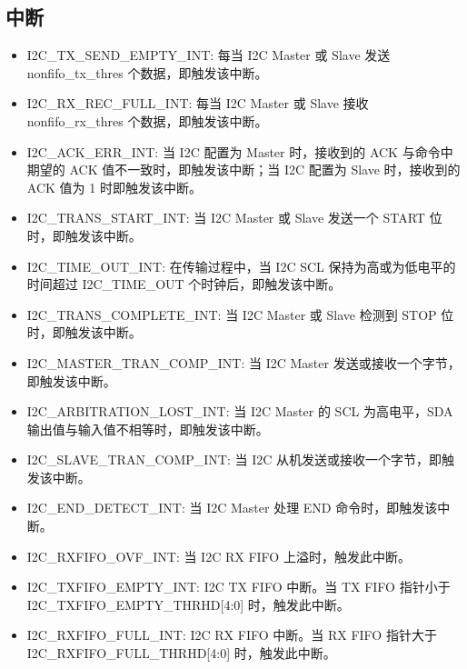 \documentclass[main\_\_CN.tex]{subfiles}
\begin{document}
\subsection{中断}\label{5.3.7}
\begin{itemize}
\item \label{int:I2CTXSENDEMPTYINT}I2C\_TX\_SEND\_EMPTY\_INT: 每当 I2C Master 或 Slave 发送 nonfifo\_tx\_thres 个数据，即触发该中断。
\item \label{int:I2CRXRECFULLINT}I2C\_RX\_REC\_FULL\_INT: 每当 I2C Master 或 Slave 接收 nonfifo\_rx\_thres 个数据，即触发该中断。
\item \label{int:I2CACKERRINT}I2C\_ACK\_ERR\_INT: 当 I2C 配置为 Master 时，接收到的 ACK 与命令中期望的 ACK 值不一致时，即触发该中断；当 I2C 配置为 Slave 时，接收到的 ACK 值为 1 时即触发该中断。
\item \label{int:I2CTRANSSTARTINT}I2C\_TRANS\_START\_INT: 当 I2C Master 或 Slave 发送一个 START 位时，即触发该中断。
\item \label{int:I2CTIMEOUTINT}I2C\_TIME\_OUT\_INT: 在传输过程中，当 I2C SCL 保持为高或为低电平的时间超过 I2C\_TIME\_OUT 个时钟后，即触发该中断。
\item \label{int:I2CTRANSCOMPLETEINT}I2C\_TRANS\_COMPLETE\_INT: 当 I2C Master 或 Slave 检测到 STOP 位时，即触发该中断。
\item \label{int:I2CMASTERTRANCOMPINT}I2C\_MASTER\_TRAN\_COMP\_INT: 当 I2C Master 发送或接收一个字节，即触发该中断。
\item \label{int:I2CARBITRATIONLOSTINT}I2C\_ARBITRATION\_LOST\_INT: 当 I2C Master 的 SCL 为高电平，SDA 输出值与输入值不相等时，即触发该中断。

\item \label{int:I2CSLAVETRANCOMPINT}I2C\_SLAVE\_TRAN\_COMP\_INT: 当 I2C 从机发送或接收一个字节，即触发该中断。

\item \label{int:I2CENDDETECTINT}I2C\_END\_DETECT\_INT: 当 I2C Master 处理 END 命令时，即触发该中断。

\item \label{int:I2CRXFIFOOVFINT}I2C\_RXFIFO\_OVF\_INT: 当 I2C RX FIFO 上溢时，触发此中断。
\item \label{int:I2CTXFIFOEMPTYINT}I2C\_TXFIFO\_EMPTY\_INT:  I2C TX FIFO 中断。当 TX FIFO 指针小于I2C\_TXFIFO\_EMPTY\_THRHD[4:0] 时，触发此中断。
\item \label{int:I2CRXFIFOFULLINT}I2C\_RXFIFO\_FULL\_INT: I2C RX FIFO 中断。当 RX FIFO 指针大于 I2C\_RXFIFO\_FULL\_THRHD[4:0] 时，触发此中断。

\end{itemize}
\end{document}
